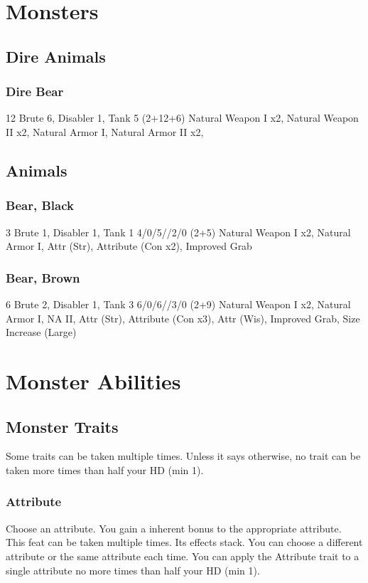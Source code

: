 \section{Monsters}

\subsection{Dire Animals}
\subsubsection{Dire Bear}
 12
 Brute 6, Disabler 1, Tank 5
 (2+12+6) Natural Weapon I x2, Natural Weapon II x2, Natural Armor I, Natural Armor II x2, 

\subsection{Animals}

\subsubsection{Bear, Black}
 3
 Brute 1, Disabler 1, Tank 1
 4/0/5//2/0
 (2+5) Natural Weapon I x2, Natural Armor I, Attr (Str), Attribute (Con x2), Improved Grab

\subsubsection{Bear, Brown}
 6
 Brute 2, Disabler 1, Tank 3
 6/0/6//3/0
 (2+9) Natural Weapon I x2, Natural Armor I, NA II, Attr (Str), Attribute (Con x3), Attr (Wis), Improved Grab, Size Increase (Large)

\section{Monster Abilities}

\subsection{Monster Traits}
Some traits can be taken multiple times. Unless it says otherwise, no trait can be taken more times than half your HD (min 1).

\subsubsection{Attribute}
Choose an attribute.
\featben You gain a  inherent bonus to the appropriate attribute.
 This feat can be taken multiple times. Its effects stack. You can choose a different attribute or the same attribute each time. You can apply the Attribute trait to a single attribute no more times than half your HD (min 1).

